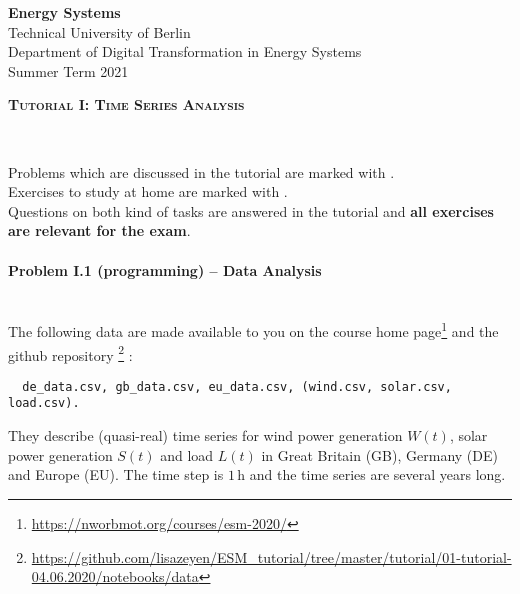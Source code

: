 \documentclass[11pt,a4paper,fleqn]{scrartcl}
\newcommand{\e}[1]{\ensuremath{\,\mathrm{#1}}}
\begin{document}
\begin{flushright}
 \textbf{Energy Systems}\\
 {\small Technical University of Berlin}\\
 {\small Department of Digital Transformation in Energy Systems}\\
 {\small Summer Term 2021}\\
\end{flushright}

 
 \vspace{-0.5em}
 \hrulefill
 \vspace{0.3em}

\begin{center}
 \textbf{\textsc{\Large Tutorial I: Time Series Analysis}}\\[2.5em]
\end{center}

\vspace{-0.8em}
\hrulefill
\vspace{0.8em} \\
\begin{tcolorbox}
Problems which are discussed in the tutorial are marked with \faGroup. \\
Exercises to study at home are marked with \faHome. \\
Questions on both kind of tasks are answered in the tutorial and \textbf{all exercises are relevant for the exam}.
\end{tcolorbox}
\paragraph{Problem I.1 (programming) -- Data Analysis \faGroup}~\\

The following data are made available to you on the course home
page\footnote{\url{https://nworbmot.org/courses/esm-2020/}} and the github repository \footnote{\url{https://github.com/lisazeyen/ESM_tutorial/tree/master/tutorial/01-tutorial-04.06.2020/notebooks/data}} :
\begin{verbatim}
  de_data.csv, gb_data.csv, eu_data.csv, (wind.csv, solar.csv, load.csv).
\end{verbatim}
They describe (quasi-real) time series for wind power generation \(W(t)\), solar power generation \(S(t)\) and load \(L(t)\) in Great Britain (GB), Germany (DE) and Europe (EU). The time step is \(1\e{h}\) and the time series are several years long.
\end{document}
